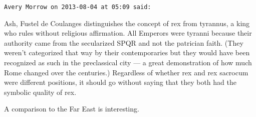 \begin{footnotesize}
\begin{sffamily}
\hfill

\texttt{Avery Morrow on 2013-08-04 at 05:09 said: }

Ash, Fustel de Coulanges distinguishes the concept of rex from tyrannus, a king who rules without religious affirmation. All Emperors were tyranni because their authority came from the secularized SPQR and not the patrician faith. (They weren't categorized that way by their contemporaries but they would have been recognized as such in the preclassical city — a great demonstration of how much Rome changed over the centuries.) Regardless of whether rex and rex sacrocum were different positions, it should go without saying that they both had the symbolic quality of rex.

A comparison to the Far East is interesting.


\end{sffamily}\end{footnotesize}
